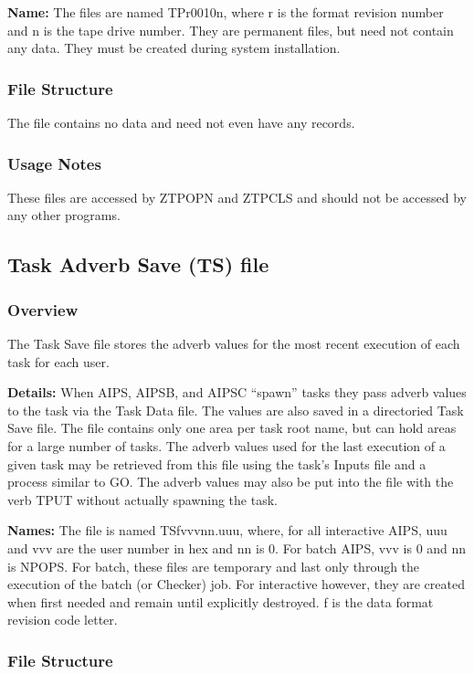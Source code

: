 {\bf Name:}  The files are named TPr0010n, where r is the format
revision number and n is the tape drive number.
They are permanent files, but need not contain any data.  They must be
created during system installation.


\subsubsection{File Structure}

     The file contains no data and need not even have any records.
\subsubsection{Usage Notes}


     These files are accessed by ZTPOPN and
ZTPCLS and should not be accessed by any other programs.

\subsection{Task Adverb Save (TS) file}
\subsubsection{Overview}

  The Task Save file stores the adverb values for the most
recent execution of each task for each user.

{\bf Details:}  When AIPS, AIPSB, and AIPSC ``spawn'' tasks they pass adverb
values to the task via the Task Data file.  The values are also saved
in a directoried Task Save file.  The file contains only one area per
task root name, but can hold areas for a large number of tasks.  The
adverb values used for the last execution of a given task may be
retrieved from this file using the task's Inputs file and a process
similar to GO.  The adverb values may also be put into the file with
the verb TPUT without actually spawning the task.

{\bf Names:}  The file is named TSfvvvnn.uuu, where, for all interactive
AIPS, uuu and vvv are the user number in hex and nn is 0.  For batch
AIPS, vvv is 0 and nn is NPOPS.  For batch, these files are temporary
and last only through the execution of the batch (or Checker) job.
For interactive however, they are created when first needed and remain
until explicitly destroyed.  f is the data format revision code letter.


\subsubsection{File Structure}


